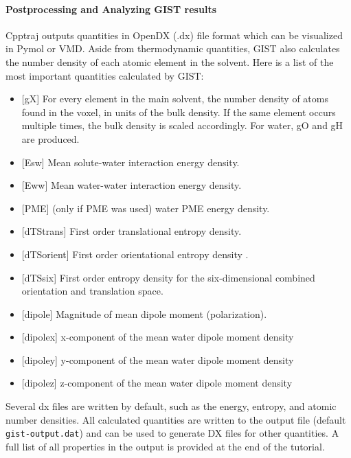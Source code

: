 \documentclass[9pt,tutorial]{livecoms}
\newcommand\inlinecode{\texttt}
\begin{document}
\paragraph{Postprocessing and Analyzing GIST results}
Cpptraj outputs quantities in OpenDX (.dx) file format which can be visualized in Pymol or VMD.
Aside from thermodynamic quantities, GIST also calculates the number density of each atomic element in the solvent.
Here is a list of the most important quantities calculated by GIST:

\begin{itemize}
	\item{[gX] For every element in the main solvent, the number density of atoms found in the voxel, in units of the bulk density. If the same element occurs multiple times, the bulk density is scaled accordingly. For water, gO and gH are produced.}
	\item{[Esw] Mean solute-water interaction energy density.}
	\item{[Eww] Mean water-water interaction energy density.}
	\item{[PME] (only if PME was used) water PME energy density.}
	\item{[dTStrans] First order translational entropy density.}
	\item{[dTSorient] First order orientational entropy density .}
	\item{[dTSsix] First order entropy density for the six-dimensional combined orientation and translation space.}
	\item{[dipole] Magnitude of mean dipole moment (polarization).}
	\item{[dipolex] x-component of the mean water dipole moment density}
	\item{[dipoley] y-component of the mean water dipole moment density}
	\item{[dipolez] z-component of the mean water dipole moment density}
\end{itemize}

Several dx files are written by default, such as the energy, entropy, and atomic number densities.
All calculated quantities are written to the output file (default \inlinecode{gist-output.dat}) and can be used to generate DX files for other quantities.
A full list of all properties in the output is provided at the end of the tutorial.
\end{document}
